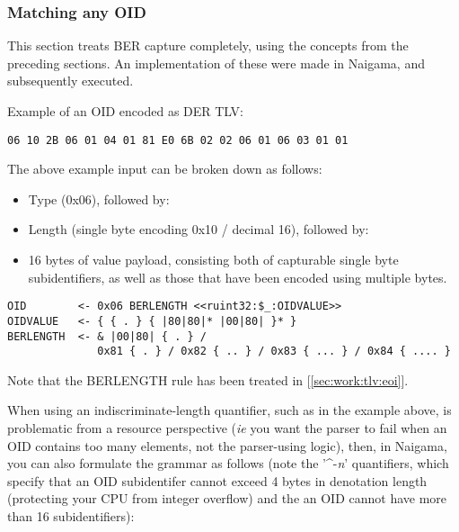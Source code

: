 \subsubsection{Matching any OID}

This section treats BER capture completely, using the concepts from the 
preceding sections. An implementation of these were made in Naigama, and 
subsequently executed. 

Example of an OID encoded as DER TLV:

\begin{changemargin}{-60mm}{0mm}
\begin{myquote}
\begin{verbatim}
06 10 2B 06 01 04 01 81 E0 6B 02 02 06 01 06 03 01 01
\end{verbatim}
\end{myquote}
\end{changemargin}

The above example input can be broken down as follows:

\begin{itemize}
    \item Type (0x06), followed by:
    \item Length (single byte encoding 0x10 / decimal 16), followed by:
    \item 16 bytes of value payload, consisting both of capturable single 
byte subidentifiers, as well as those that have been encoded using 
multiple bytes.
\end{itemize}


\begin{changemargin}{-60mm}{0mm}
\begin{myquote}
\begin{verbatim}
OID        <- 0x06 BERLENGTH <<ruint32:$_:OIDVALUE>>
OIDVALUE   <- { { . } { |80|80|* |00|80| }* }
BERLENGTH  <- & |00|80| { . } /
              0x81 { . } / 0x82 { .. } / 0x83 { ... } / 0x84 { .... }
\end{verbatim}
\end{myquote}
\end{changemargin}

Note that the BERLENGTH rule has been treated in [\ref{sec:work:tlv:eoi}].


When using an indiscriminate-length quantifier, such as in the example
above, is problematic from a resource perspective (\textit{ie} you
want the parser to fail when an OID contains too many elements, not
the parser-using logic), then, in Naigama, you can also formulate the
grammar as follows (note the '\^{}-\textit{n}' quantifiers, which specify
that an OID subidentifer cannot exceed 4 bytes in denotation length
(protecting your CPU from integer overflow) and the an OID cannot have
more than 16 subidentifiers):

